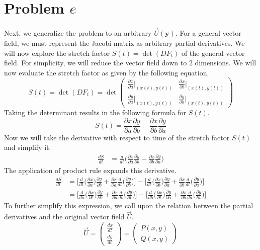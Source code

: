 \documentclass[a4paper]{article}
\newcommand{\pder}[2]{\frac{\partial#1}{\partial#2}}
\newcommand{\derof}[2]{\frac{d}{d#1}\Big(#2\Big)}
\newcommand{\der}[2]{\frac{d#1}{d#2}}
\begin{document}
\section{Problem $e$}
Next, we generalize the problem to an arbitrary $\vec{U}(\mathbf{y})$. For a general vector field, we must represent the Jacobi matrix as arbitrary partial derivatives. We will now explore the stretch factor $S(t) = \det(DF_t)$ of the general vector field. For simplicity, we will reduce the vector field down to $2$ dimensions. We will now evaluate the stretch factor as given by the following equation.
\begin{equation*}
	S(t) = \det(DF_t) = \det \begin{pmatrix}
	\pder{x}{a}\rvert_{(x(t),y(t))} & \pder{x}{b}\rvert_{(x(t),y(t))} \\[1ex]
	\pder{y}{a}\rvert_{(x(t),y(t))} & \pder{y}{b}\rvert_{(x(t),y(t))}
	\end{pmatrix}
\end{equation*}
Taking the determinant results in the following formula for $S(t)$.
\begin{equation*}
	S(t) = \pder{x}{a}\pder{y}{b} - \pder{x}{b}\pder{y}{a}
\end{equation*}
Now we will take the derivative with respect to time of the stretch factor $S(t)$ and simplify it.
\begin{align*}
	\der{S}{t} &= \derof{t}{\pder{x}{a}\pder{y}{b} - \pder{x}{b}\pder{y}{a}}
\end{align*}
The application of product rule expands this derivative.
\begin{align*}
	\der{S}{t} &= \Big[\derof{t}{\pder{x}{a}}\pder{y}{b}
	+\pder{x}{a}\derof{t}{\pder{y}{b}}\Big]
	-\Big[\derof{t}{\pder{x}{b}}\pder{y}{a}
	+ \pder{x}{b}\derof{t}{\pder{y}{a}}\Big] \\
	&= \Big[\derof{a}{\pder{x}{t}}\pder{y}{b}
	+\pder{x}{a}\derof{b}{\pder{y}{t}}\Big]
	-\Big[\derof{b}{\pder{x}{t}}\pder{y}{a}
	+ \pder{x}{b}\derof{a}{\pder{y}{t}}\Big]
\end{align*}
To further simplify this expression, we call upon the relation between the partial derivatives and the original vector field $\vec{U}$.
\begin{equation*}
\vec{U} 
= \begin{pmatrix}\der{x}{t} \\[1ex] \der{y}{t}\end{pmatrix}
= \begin{pmatrix}P(x,y) \\ Q(x,y)\end{pmatrix}
\end{equation*}
\end{document}
